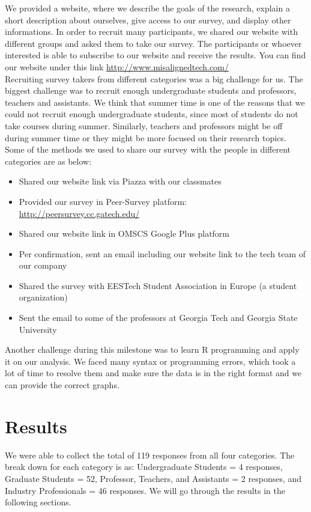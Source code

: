 \documentclass{sigchi}
\begin{document}
We provided a website, where we describe the goals of the research, explain a short description about ourselves, give access to our survey, and display other informations. In order to recruit many participants, we shared our website with different groups and asked them to take our survey. The participants or whoever interested is able to subscribe to our website and receive the results. You can find our website under this link \url{http://www.misalignedtech.com/}\\
Recruiting survey takers from different categories was a big challenge for us. The biggest challenge was to recruit enough undergraduate students and professors, teachers and assistants. We think that summer time is one of the reasons that we could not recruit enough undergraduate students, since most of students do not take courses during summer. Similarly, teachers and professors might be off during summer time or they might be more focused on their research topics. Some of the methods we used to share our survey with the people in different categories are as below:
\begin{itemize}
	\item Shared our website link via Piazza with our classmates
	\item Provided our survey in Peer-Survey platform: \url{http://peersurvey.cc.gatech.edu/}
	\item Shared our website link in OMSCS Google Plus platform
	\item Per confirmation, sent an email including our website link to the tech team of our company
	\item Shared the survey with EESTech Student Association in Europe (a student organization)
	\item Sent the email to some of the professors at Georgia Tech and Georgia State University
\end{itemize}

Another challenge during this milestone was to learn R programming and apply it on our analysis. We faced many syntax or programming errors, which took a lot of time to resolve them and make sure the data is in the right format and we can provide the correct graphs.

\section{Results}
We were able to collect the total of 119 responses from all four categories. The break down for each category is as: Undergraduate Students = 4 responses, Graduate Students = 52, Professor, Teachers, and Assistants = 2 responses, and Industry Professionals = 46 responses.
We will go through the results in the following sections.
\end{document}
